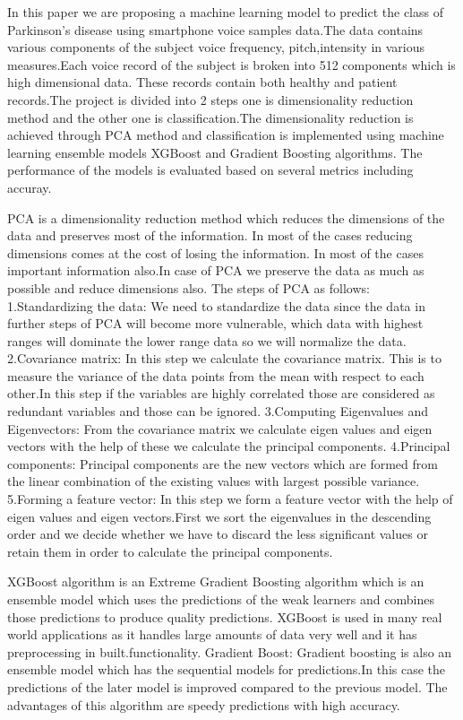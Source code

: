 \documentclass[conference]{IEEEtran}
\begin{document}
In this paper we are proposing a machine learning model to predict the class of Parkinson’s disease using smartphone voice samples data.The data contains various components of the subject voice frequency, pitch,intensity in various measures.Each voice record of the subject is broken into 512 components which is high dimensional data. These records contain both healthy and patient records.The project is divided into 2 steps one is dimensionality reduction method and the other one is classification.The dimensionality reduction is achieved through PCA method and classification is implemented using machine learning ensemble models XGBoost and Gradient Boosting algorithms. The performance of the models is evaluated based on several metrics including accuray.

PCA is a dimensionality reduction method which reduces the dimensions of the data and preserves most of the information. In most of the cases reducing dimensions comes at the cost of losing the information. In most of the cases important information also.In case of PCA we preserve the data as much as possible and reduce dimensions also.
The steps of PCA as follows:
1.Standardizing the data:
We need to standardize the data since the data in further steps of PCA will become more vulnerable, which data with highest ranges will dominate the lower range data so we will normalize the data.
2.Covariance matrix:
In this step we calculate the covariance matrix. This is to measure the variance of the data points from the mean with respect to each other.In this step if the variables are highly correlated those are considered as redundant variables and those can be ignored.
3.Computing Eigenvalues and Eigenvectors:
From the covariance matrix we calculate eigen values and eigen vectors with the help of these we calculate the principal components.
4.Principal components:
Principal components are the new vectors which are formed from the linear combination of the existing values with largest possible variance.
5.Forming a feature vector:
In this step we form a feature vector with the help of eigen values and eigen vectors.First we sort the eigenvalues in the descending order and we decide whether we have to discard the less significant values or retain them in order to calculate the principal components.

XGBoost algorithm is an Extreme Gradient Boosting algorithm which is an ensemble model which uses the predictions of the weak learners and combines those predictions to produce quality predictions. XGBoost is used in many real world applications as it handles large amounts of data very well and it has preprocessing in built.functionality.
Gradient Boost:
Gradient boosting is also an ensemble model which has the sequential models for predictions.In this case the predictions of the later model is improved compared to the previous model.
The advantages of this algorithm are speedy predictions with high accuracy.
\end{document}
